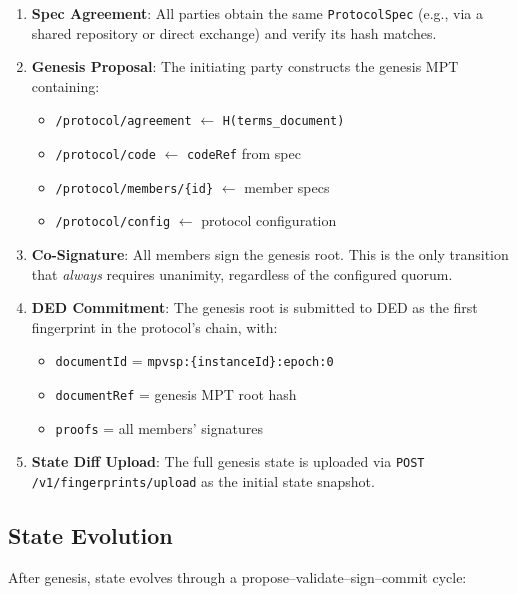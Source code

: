 \documentclass[11pt,a4paper]{article}
\begin{document}
\begin{enumerate}[nosep]
  \item \textbf{Spec Agreement}: All parties obtain the same
    \texttt{ProtocolSpec} (e.g., via a shared repository or direct exchange)
    and verify its hash matches.
  \item \textbf{Genesis Proposal}: The initiating party constructs the genesis
    MPT containing:
    \begin{itemize}[nosep]
      \item \texttt{/protocol/agreement} $\gets$ \texttt{H(terms\_document)}
      \item \texttt{/protocol/code} $\gets$ \texttt{codeRef} from spec
      \item \texttt{/protocol/members/\{id\}} $\gets$ member specs
      \item \texttt{/protocol/config} $\gets$ protocol configuration
    \end{itemize}
  \item \textbf{Co-Signature}: All members sign the genesis root. This is the
    only transition that \emph{always} requires unanimity, regardless of the
    configured quorum.
  \item \textbf{DED Commitment}: The genesis root is submitted to DED as the
    first fingerprint in the protocol's chain, with:
    \begin{itemize}[nosep]
      \item \texttt{documentId} = \texttt{mpvsp:\{instanceId\}:epoch:0}
      \item \texttt{documentRef} = genesis MPT root hash
      \item \texttt{proofs} = all members' signatures
    \end{itemize}
  \item \textbf{State Diff Upload}: The full genesis state is uploaded via
    \texttt{POST /v1/fingerprints/upload} as the initial state snapshot.
\end{enumerate}

\subsection{State Evolution}
\label{sec:evolution}

After genesis, state evolves through a propose--validate--sign--commit cycle:
\end{document}
